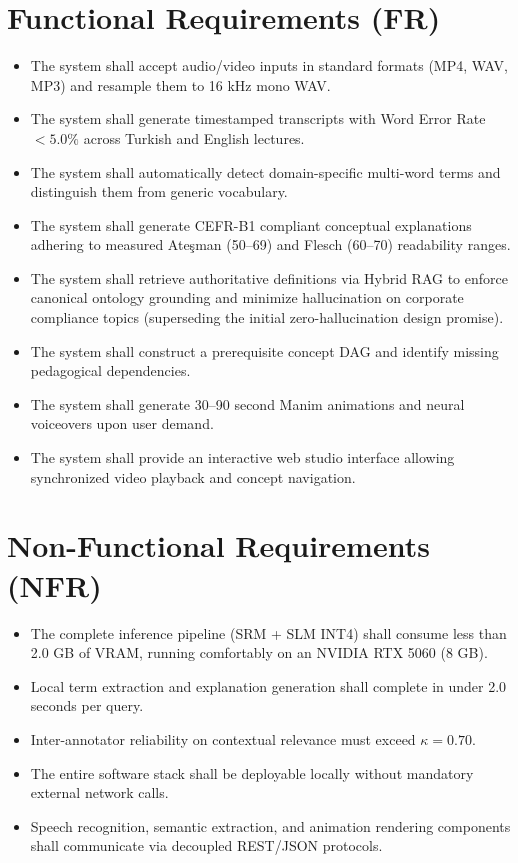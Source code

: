 \documentclass[a4paper,12pt]{report}
\begin{document}
\section{Functional Requirements (FR)}
\begin{itemize}[leftmargin=2.5em]
    \item[\textbf{FR1:}] The system shall accept audio/video inputs in standard formats (MP4, WAV, MP3) and resample them to 16 kHz mono WAV.
    \item[\textbf{FR2:}] The system shall generate timestamped transcripts with Word Error Rate $< 5.0\%$ across Turkish and English lectures.
    \item[\textbf{FR3:}] The system shall automatically detect domain-specific multi-word terms and distinguish them from generic vocabulary.
    \item[\textbf{FR4:}] The system shall generate CEFR-B1 compliant conceptual explanations adhering to measured Ateşman (50--69) and Flesch (60--70) readability ranges.
    \item[\textbf{FR5 (Superseded Projection):}] The system shall retrieve authoritative definitions via Hybrid RAG to enforce canonical ontology grounding and minimize hallucination on corporate compliance topics (superseding the initial zero-hallucination design promise).
    \item[\textbf{FR6:}] The system shall construct a prerequisite concept DAG and identify missing pedagogical dependencies.
    \item[\textbf{FR7:}] The system shall generate 30--90 second Manim animations and neural voiceovers upon user demand.
    \item[\textbf{FR8:}] The system shall provide an interactive web studio interface allowing synchronized video playback and concept navigation.
\end{itemize}

\section{Non-Functional Requirements (NFR)}
\begin{itemize}[leftmargin=2.5em]
    \item[\textbf{NFR1 (Edge Efficiency):}] The complete inference pipeline (SRM + SLM INT4) shall consume less than 2.0 GB of VRAM, running comfortably on an NVIDIA RTX 5060 (8 GB).
    \item[\textbf{NFR2 (Latency):}] Local term extraction and explanation generation shall complete in under 2.0 seconds per query.
    \item[\textbf{NFR3 (Reliability):}] Inter-annotator reliability on contextual relevance must exceed $\kappa = 0.70$.
    \item[\textbf{NFR4 (Privacy \& Air-Gapping):}] The entire software stack shall be deployable locally without mandatory external network calls.
    \item[\textbf{NFR5 (Modularity):}] Speech recognition, semantic extraction, and animation rendering components shall communicate via decoupled REST/JSON protocols.
\end{itemize}
\end{document}
